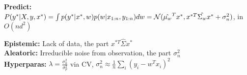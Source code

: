 \textbf{Predict:} $P(y^* | X,y,x^*) = \int p(y^* | x^*, w) p(w| x_{1:n}, y_{1:n}) dw\\ 
= \mathcal{N}(\hat{\mu_w}^Tx^*, x^{*T}\hat{\Sigma_w}x^* + \sigma_n^2)$, in $O(nd^2)$\\
\begin{comment}
	The predictive distribution is dependent on the distribution over the weights, as it averages over all possible weights.
	The predicted point $y^*$ adds variance, as the point can be seen as the prediction of $w^Tx^* + \epsilon$.\\
\end{comment}

\textbf{Epistemic:} Lack of data, the part $x^{*T}\hat{\Sigma}x^*$\\
\textbf{Aleatoric:} Irreducible noise from observation, the part $\sigma_n^2$\\

\textbf{Hyperparas:} $\lambda = \frac{\sigma_n^2}{\sigma_p^2}$ via CV, $\sigma_n^2 \approx \frac{1}{n}\sum_i(y_i - w^Tx_i)^2$\\
\begin{comment}
	The variance of the weights can then be derived from these two equations.\\
\end{comment}

